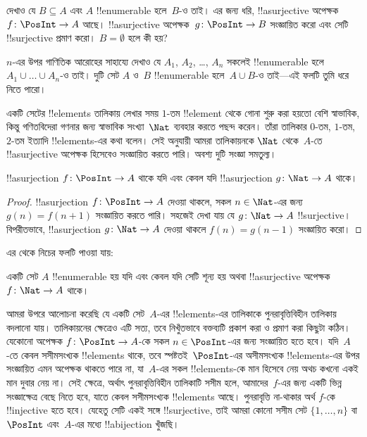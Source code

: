 \documentclass[../../../include/open-logic-section]{subfiles}
\begin{document}
\begin{prob}
  দেখাও যে $B \subseteq A$ এবং $A$ !!{enumerable} হলে~$B$-ও তাই। এর জন্য ধরি, !!a{surjective} অপেক্ষক $f\colon \PosInt \to
  A$ আছে। !!a{surjective} অপেক্ষক~$g\colon \PosInt \to B$ সংজ্ঞায়িত করো এবং সেটি !!{surjective} প্রমাণ করো। $B = \emptyset$ হলে কী হয়?
\end{prob}

\begin{prob}
  $n$-এর উপর গাণিতিক আরোহের সাহায্যে দেখাও যে $A_1$, $A_2$, \dots, $A_n$ সকলেই !!{enumerable} হলে $A_1 \cup \dots \cup A_n$-ও তাই। দুটি সেট $A$ ও~$B$ !!{enumerable} হলে~$A \cup
  B$-ও তাই—এই ফলটি তুমি ধরে নিতে পারো।
\end{prob}

একটি সেটের !!{element}s তালিকায় লেখার সময় $1$-তম !!{element} থেকে গোনা শুরু করা হয়তো বেশি স্বাভাবিক, কিন্তু গণিতবিদেরা গণনার জন্য স্বাভাবিক সংখ্যা~$\Nat$ ব্যবহার করতে পছন্দ করেন। তাঁরা তালিকার $0$-তম, $1$-তম, $2$-তম ইত্যাদি !!{element}s-এর কথা বলেন। সেই অনুযায়ী আমরা তালিকায়নকে $\Nat$ থেকে~$A$-তে !!a{surjective} অপেক্ষক হিসেবেও সংজ্ঞায়িত করতে পারি। অবশ্য দুটি সংজ্ঞা সমতুল্য।

\begin{prop}
  !!a{surjection} $f\colon \PosInt \to A$ থাকে যদি এবং কেবল যদি !!a{surjection} $g\colon \Nat \to A$ থাকে।
\end{prop}

\begin{proof}
  !!a{surjection} $f\colon \PosInt \to A$ দেওয়া থাকলে, সকল $n \in \Nat$-এর জন্য $g(n) =
  f(n+1)$ সংজ্ঞায়িত করতে পারি। সহজেই দেখা যায় যে $g\colon \Nat
  \to A$ !!{surjective}। বিপরীতভাবে, !!a{surjection} $g\colon
  \Nat \to A$ দেওয়া থাকলে $f(n) = g(n-1)$ সংজ্ঞায়িত করো।
\end{proof}

এর থেকে নিচের ফলটি পাওয়া যায়:

\begin{cor}
একটি সেট $A$ !!{enumerable} হয় যদি এবং কেবল যদি সেটি শূন্য হয় অথবা !!a{surjective} অপেক্ষক $f\colon \Nat \to A$ থাকে।
\end{cor}

আমরা উপরে আলোচনা করেছি যে একটি সেট~$A$-এর !!{element}s-এর তালিকাকে পুনরাবৃত্তিবিহীন তালিকায় বদলানো যায়। তালিকায়নের ক্ষেত্রেও এটি সত্য, তবে নিখুঁতভাবে বক্তব্যটি প্রকাশ করা ও প্রমাণ করা কিছুটা কঠিন। যেকোনো অপেক্ষক $f\colon \PosInt \to A$-কে সকল $n \in
\PosInt$-এর জন্য সংজ্ঞায়িত হতে হবে। যদি~$A$-তে কেবল সসীমসংখ্যক !!{element}s থাকে, তবে স্পষ্টতই~$\PosInt$-এর অসীমসংখ্যক !!{element}s-এর উপর সংজ্ঞায়িত এমন অপেক্ষক থাকতে পারে না, যা~$A$-এর সকল !!{element}s-কে মান হিসেবে নেয় অথচ কখনো একই মান দুবার নেয় না। সেই ক্ষেত্রে, অর্থাৎ পুনরাবৃত্তিবিহীন তালিকাটি সসীম হলে, আমাদের~$f$-এর জন্য একটি ভিন্ন সংজ্ঞাক্ষেত্র বেছে নিতে হবে, যাতে কেবল সসীমসংখ্যক !!{element}s আছে। পুনরাবৃত্তি না-থাকার অর্থ $f$-কে !!{injective} হতে হবে। যেহেতু সেটি একই সঙ্গে !!{surjective}, তাই আমরা কোনো সসীম সেট $\{1, \dots, n\}$ বা $\PosInt$ এবং~$A$-এর মধ্যে !!a{bijection} খুঁজছি।
\end{document}
